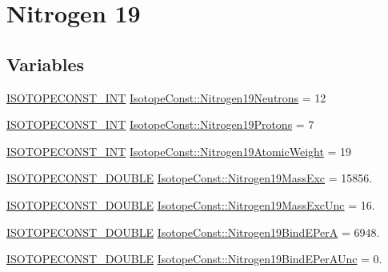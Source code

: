 \hypertarget{group___isotope_const-_nitrogen-_n19}{}\section{Nitrogen 19}
\label{group___isotope_const-_nitrogen-_n19}
\subsection*{Variables}
\begin{DoxyCompactItemize}
\item 
\mbox{\hyperlink{group___isotope_const-_macros_ga5f18360b3e99483a35c32d789e62621c}{I\+S\+O\+T\+O\+P\+E\+C\+O\+N\+S\+T\+\_\+\+I\+NT}} \mbox{\hyperlink{group___isotope_const-_nitrogen-_n19_gab844562a39de010e614224c03434efc2}{Isotope\+Const\+::\+Nitrogen19\+Neutrons}} = 12
\item 
\mbox{\hyperlink{group___isotope_const-_macros_ga5f18360b3e99483a35c32d789e62621c}{I\+S\+O\+T\+O\+P\+E\+C\+O\+N\+S\+T\+\_\+\+I\+NT}} \mbox{\hyperlink{group___isotope_const-_nitrogen-_n19_gadad4b2244298bca1fc1c558f929168b2}{Isotope\+Const\+::\+Nitrogen19\+Protons}} = 7
\item 
\mbox{\hyperlink{group___isotope_const-_macros_ga5f18360b3e99483a35c32d789e62621c}{I\+S\+O\+T\+O\+P\+E\+C\+O\+N\+S\+T\+\_\+\+I\+NT}} \mbox{\hyperlink{group___isotope_const-_nitrogen-_n19_gaa1d1fb4146b584a1e9fdbfc581a50eb2}{Isotope\+Const\+::\+Nitrogen19\+Atomic\+Weight}} = 19
\item 
\mbox{\hyperlink{group___isotope_const-_macros_ga8f45a7272ce02c0b4c65c44636ed719a}{I\+S\+O\+T\+O\+P\+E\+C\+O\+N\+S\+T\+\_\+\+D\+O\+U\+B\+LE}} \mbox{\hyperlink{group___isotope_const-_nitrogen-_n19_ga2602baef8d8e6e13079427247e149719}{Isotope\+Const\+::\+Nitrogen19\+Mass\+Exc}} = 15856.
\item 
\mbox{\hyperlink{group___isotope_const-_macros_ga8f45a7272ce02c0b4c65c44636ed719a}{I\+S\+O\+T\+O\+P\+E\+C\+O\+N\+S\+T\+\_\+\+D\+O\+U\+B\+LE}} \mbox{\hyperlink{group___isotope_const-_nitrogen-_n19_gafb5e58f62f5e6fe8a36853d17649486b}{Isotope\+Const\+::\+Nitrogen19\+Mass\+Exc\+Unc}} = 16.
\item 
\mbox{\hyperlink{group___isotope_const-_macros_ga8f45a7272ce02c0b4c65c44636ed719a}{I\+S\+O\+T\+O\+P\+E\+C\+O\+N\+S\+T\+\_\+\+D\+O\+U\+B\+LE}} \mbox{\hyperlink{group___isotope_const-_nitrogen-_n19_gaca4c324d5c01c1467ce7349fbf6da825}{Isotope\+Const\+::\+Nitrogen19\+Bind\+E\+PerA}} = 6948.
\item 
\mbox{\hyperlink{group___isotope_const-_macros_ga8f45a7272ce02c0b4c65c44636ed719a}{I\+S\+O\+T\+O\+P\+E\+C\+O\+N\+S\+T\+\_\+\+D\+O\+U\+B\+LE}} \mbox{\hyperlink{group___isotope_const-_nitrogen-_n19_ga025f8a1cde368dae5388214e2f9a083e}{Isotope\+Const\+::\+Nitrogen19\+Bind\+E\+Per\+A\+Unc}} = 0.

\end{DoxyCompactItemize}
